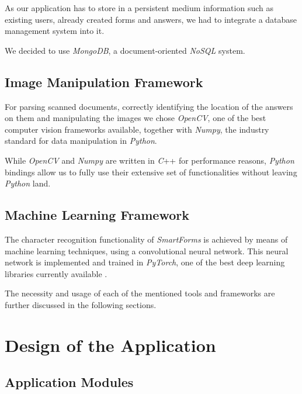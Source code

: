 \documentclass[11pt, a4paper]{report}
\begin{document}
As our application has to store in a persistent medium information such as existing users, already created forms and answers, we had to integrate a database management system into it.

We decided to use \textit{MongoDB}, a document-oriented \textit{NoSQL} system.

\section{Image Manipulation Framework}

For parsing scanned documents, correctly identifying the location of the answers on them and manipulating the images we chose \textit{OpenCV}, one of the best computer vision frameworks available, together with \textit{Numpy}, the industry standard for data manipulation in \textit{Python}.

While \textit{OpenCV} and \textit{Numpy} are written in \textit{C}++ for performance reasons, \textit{Python} bindings allow us to fully use their extensive set of functionalities without leaving \textit{Python} land.

\section{Machine Learning Framework}

The character recognition functionality of \textit{SmartForms} is achieved by means of machine learning techniques, using a convolutional neural network.
This neural network is implemented and trained in \textit{PyTorch}, one of the best deep learning libraries currently available \cite{pytorch}.

\vspace{1em}

The necessity and usage of each of the mentioned tools and frameworks are further discussed in the following sections.


\chapter{Design of the Application}
\label{chapter-design-of-the-application}

\section{Application Modules}
\end{document}
